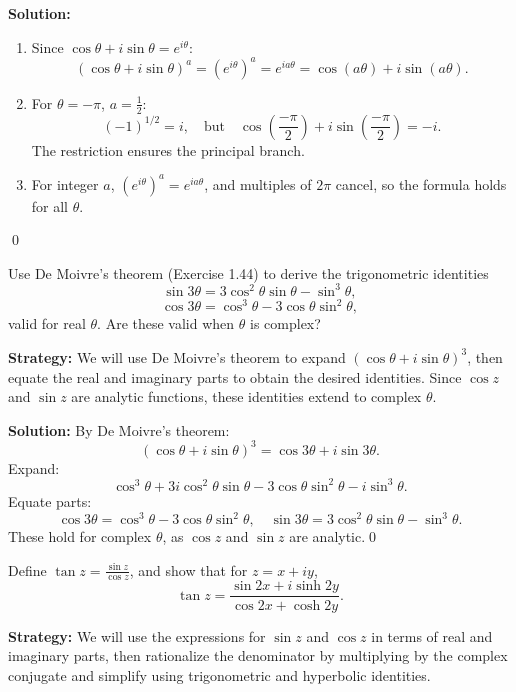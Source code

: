 \bigskip\noindent\textbf{Solution:}
\begin{enumerate}[label=\roman*)]
\item Since \( \cos \theta + i \sin \theta = e^{i\theta} \):
\[
(\cos \theta + i \sin \theta)^a = (e^{i\theta})^a = e^{i a \theta} = \cos(a\theta) + i \sin(a\theta).
\]
\item For \( \theta = -\pi \), \( a = \frac{1}{2} \):
\[
(-1)^{1/2} = i, \quad \text{but} \quad \cos\left(\frac{-\pi}{2}\right) + i \sin\left(\frac{-\pi}{2}\right) = -i.
\]
The restriction ensures the principal branch.
\item For integer \( a \), \( (e^{i\theta})^a = e^{i a \theta} \), and multiples of \( 2\pi \) cancel, so the formula holds for all \( \theta \).
\end{enumerate}\qed


\begin{problembox}
Use De Moivre's theorem (Exercise 1.44) to derive the trigonometric identities
\[
\sin 3\theta = 3 \cos^2 \theta \sin \theta - \sin^3 \theta,
\]
\[
\cos 3\theta = \cos^3 \theta - 3 \cos \theta \sin^2 \theta,
\]
valid for real \( \theta \). Are these valid when \( \theta \) is complex?
\end{problembox}

\noindent\textbf{Strategy:} We will use De Moivre's theorem to expand $(\cos \theta + i \sin \theta)^3$, then equate the real and imaginary parts to obtain the desired identities. Since $\cos z$ and $\sin z$ are analytic functions, these identities extend to complex $\theta$.

\bigskip\noindent\textbf{Solution:}
By De Moivre's theorem:
\[
(\cos \theta + i \sin \theta)^3 = \cos 3\theta + i \sin 3\theta.
\]
Expand:
\[
\cos^3 \theta + 3i \cos^2 \theta \sin \theta - 3 \cos \theta \sin^2 \theta - i \sin^3 \theta.
\]
Equate parts:
\[
\cos 3\theta = \cos^3 \theta - 3 \cos \theta \sin^2 \theta, \quad \sin 3\theta = 3 \cos^2 \theta \sin \theta - \sin^3 \theta.
\]
These hold for complex \( \theta \), as \( \cos z \) and \( \sin z \) are analytic.\qed


\begin{problembox}
Define \( \tan z = \frac{\sin z}{\cos z} \), and show that for \( z = x + iy \),
\[
\tan z = \frac{\sin 2x + i \sinh 2y}{\cos 2x + \cosh 2y}.
\]
\end{problembox}

\noindent\textbf{Strategy:} We will use the expressions for $\sin z$ and $\cos z$ in terms of real and imaginary parts, then rationalize the denominator by multiplying by the complex conjugate and simplify using trigonometric and hyperbolic identities.

